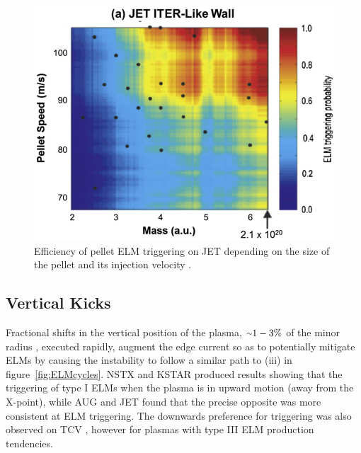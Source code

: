 \documentclass[11pt, twocolumn]{article}  %
\providecommand{\squiggle}{\raise.17ex\hbox{$\scriptstyle\sim$}} %
\begin{document}
\begin{figure}
\includegraphics[scale=0.45]{Figures/PI_ELM.png}
\centering
\caption{Efficiency of pellet ELM triggering on JET depending on the size of the pellet and its injection velocity \cite{Baylor2015}.}\label{fig:PI_ELM}
\end{figure}


\subsection{Vertical Kicks}\label{ssec:Vkicks}
Fractional shifts in the vertical position of the plasma, $\squiggle 1-3\%$ of the minor radius \cite{KirkFF}, executed rapidly, augment the edge current so as to potentially mitigate ELMs \cite{DelaLuna2016} by causing the instability to follow a similar path to (iii) in figure~\ref{fig:ELMcycles}. NSTX \cite{Gerhardt2010} and KSTAR \cite{Kim2012} produced results showing that the triggering of type I ELMs when the plasma is in upward motion (away from the X-point), while AUG \cite{Lang2004} and JET \cite{DelaLuna2016} found that the precise opposite was more consistent at ELM triggering. The downwards preference for triggering was also observed on TCV \cite{Degeling2003}, however for plasmas with type III ELM production tendencies.
\end{document}

